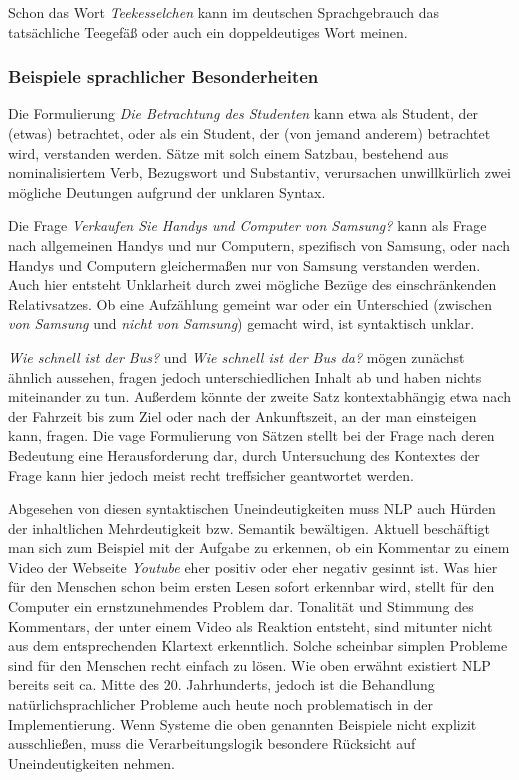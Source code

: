 \documentclass[12pt]{report}
\begin{document}
Schon das Wort \textit{Teekesselchen} kann im deutschen Sprachgebrauch das tatsächliche Teegefäß oder auch ein doppeldeutiges Wort meinen. 
\subsubsection{Beispiele sprachlicher Besonderheiten}

Die Formulierung \textit{\glqq   Die Betrachtung des Studenten\grqq{}} kann etwa als Student, der (etwas) betrachtet, oder als ein Student, der (von jemand anderem) betrachtet wird, verstanden werden. Sätze mit solch einem Satzbau, bestehend aus nominalisiertem Verb, Bezugswort und Substantiv, verursachen unwillkürlich zwei mögliche Deutungen aufgrund der unklaren Syntax.

Die Frage \textit{\glqq  Verkaufen Sie Handys und Computer von Samsung?\grqq{}} kann als Frage nach allgemeinen Handys und nur Computern, spezifisch von Samsung, oder nach Handys und Computern gleichermaßen nur von Samsung verstanden werden. Auch hier entsteht Unklarheit durch zwei mögliche Bezüge des einschränkenden Relativsatzes. Ob eine Aufzählung gemeint war oder ein Unterschied (zwischen \textit{von Samsung} und \textit{nicht von Samsung}) gemacht wird, ist syntaktisch unklar.

\textit{\glqq  Wie schnell ist der Bus?\grqq{}} und \textit{\glqq  Wie schnell ist der Bus da?\grqq{}} mögen zunächst ähnlich aussehen, fragen jedoch unterschiedlichen Inhalt ab und haben nichts miteinander zu tun. Außerdem könnte der zweite Satz kontextabhängig etwa nach der Fahrzeit bis zum Ziel oder nach der Ankunftszeit, an der man einsteigen kann, fragen. Die vage Formulierung von Sätzen stellt bei der Frage nach deren Bedeutung eine Herausforderung dar, durch Untersuchung des Kontextes der Frage kann hier jedoch meist recht treffsicher geantwortet werden.

Abgesehen von diesen syntaktischen Uneindeutigkeiten muss NLP auch Hürden der inhaltlichen Mehrdeutigkeit bzw. Semantik bewältigen. Aktuell beschäftigt man sich zum Beispiel mit der Aufgabe zu erkennen, ob ein Kommentar zu einem Video der Webseite \textit{Youtube} eher positiv oder eher negativ gesinnt ist. Was hier für den Menschen schon beim ersten Lesen sofort erkennbar wird, stellt für den Computer ein ernstzunehmendes Problem dar. Tonalität und Stimmung des Kommentars, der unter einem Video als Reaktion entsteht, sind mitunter nicht aus dem entsprechenden Klartext erkenntlich. 
Solche scheinbar simplen Probleme sind für den Menschen recht einfach zu lösen. Wie oben erwähnt existiert NLP bereits seit ca. Mitte des 20. Jahrhunderts, jedoch ist die Behandlung natürlichsprachlicher Probleme auch heute noch problematisch in der Implementierung. Wenn Systeme die oben genannten Beispiele nicht explizit ausschließen, muss die Verarbeitungslogik besondere Rücksicht auf Uneindeutigkeiten nehmen.
\end{document}
